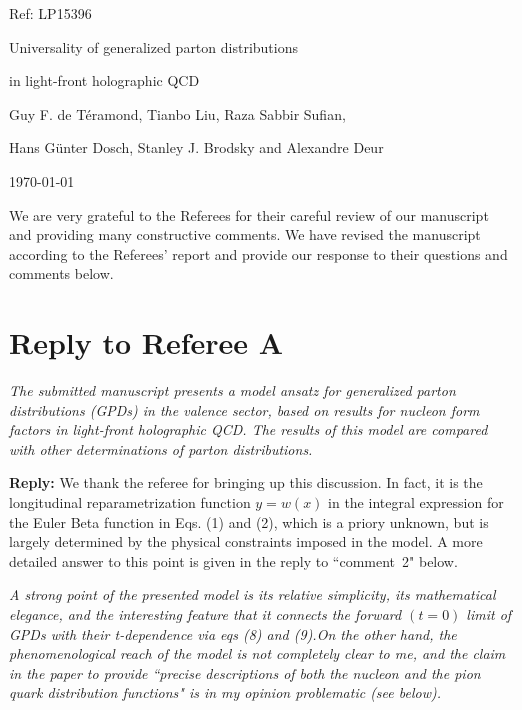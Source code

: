 \documentclass[12pt]{article}
\begin{document}
{\Large Ref:  LP15396}
 
 \vspace{20pt}

\centerline{\LARGE Universality of generalized parton distributions}

\vspace{5pt}
   
\centerline{\LARGE in light-front holographic QCD}
   
   

\vspace{10pt}

\centerline{Guy F. de T\'eramond, Tianbo Liu, Raza Sabbir Sufian,}

\centerline{Hans G\"unter Dosch,  Stanley J. Brodsky and Alexandre Deur}

\vspace{10pt}
 
\centerline{\today}

\vspace{30pt}
    
We are very grateful to the Referees for their careful review of our manuscript and providing many constructive comments. We have revised the manuscript according to the Referees' report and provide our response to their questions and comments below.

\section*{Reply to Referee A }

{\it The submitted manuscript presents a model ansatz for generalized
parton distributions (GPDs) in the valence sector, based on results
for nucleon form factors in light-front holographic QCD. The results
of this model are compared with other determinations of parton
distributions.} 

{\bf Reply:} We thank the referee for bringing up this discussion. In fact, it is the longitudinal reparametrization function $y = w(x)$ in the integral expression for the Euler Beta function in Eqs. (1) and (2), which is a priory unknown,  but is largely determined by the physical constraints imposed in the model.  A more detailed answer to this point is given in the reply to ``comment~2" below.  


{\it A strong point of the presented model is its relative simplicity, its
mathematical elegance, and the interesting feature that it connects
the forward $(t=0)$ limit of GPDs with their t-dependence via eqs (8)
and (9).On the other hand, the phenomenological reach of the model is
not completely clear to me, and the claim in the paper to provide
``precise descriptions of both the nucleon and the pion quark
distribution functions" is in my opinion problematic (see below). }
\end{document}
